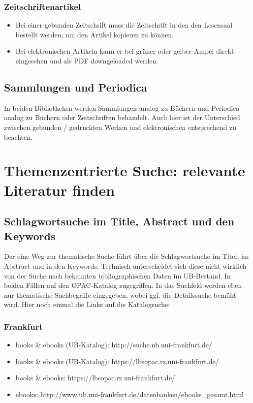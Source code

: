 \documentclass[DIV=calc,BCOR=5mm,11pt,headings=small,oneside,abstract=false, toc=bib]{scrartcl}
\begin{document}
\subsubsection{Zeitschriftenartikel}
\begin{itemize}
  \item Bei einer gebunden Zeitschrift muss die Zeitschrift in den den Lesensaal
  bestellt werden, um den Artikel kopieren zu können.
  \item Bei elektronischen Artikeln kann er bei grüner oder gelber Ampel
  direkt eingesehen und als PDF downgeloaded werden.
\end{itemize}

\subsection{Sammlungen und Periodica}

In beiden Bibliotheken werden Sammlungen analog zu Büchern und Periodica analog
zu Büchern oder Zeitschriften behandelt. Auch hier ist der Unterschied zwischen
gebunden / gedruckten Werken und elektronischen entsprechend zu beachten.

\section{Themenzentrierte Suche: relevante Literatur finden }

\subsection{Schlagwortsuche im Title, Abstract und den Keywords}
Der eine Weg zur thematische Suche führt über die Schlagwortsuche im Titel, im
Abstract und in den Keywords. Technisch unterscheidet sich diese nicht wirklich
von der Suche nach bekannten bibliographischen Daten im UB-Bestand. In beiden
Fällen auf den OPAC-Katalog zugegriffen. In das Suchfeld werden eben nur
thematische Suchbegriffe eingegeben, wobei ggf. die Detailssuche bemüht wird.
Hier noch einmal die Links auf die Katalogsuche:

\subsubsection{Frankfurt}
\begin{itemize}
  \item books \& ebooks (UB-Katalog): {\ttfamily
  http://suche.ub.uni-frankfurt.de/}
  \item books \& ebooks (UB-Katalog): {\small \ttfamily
  https://lbsopac.rz.uni-frankfurt.de/}
  \item books \& ebooks: {\ttfamily
  https://lbsopac.rz.uni-frankfurt.de/}
  \item ebooks: {\ttfamily \tiny
  http://www.ub.uni-frankfurt.de/datenbanken/ebooks\_gesamt.html}
\end{itemize}
\end{document}
